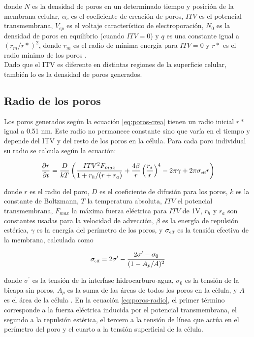 \documentclass[11pt, twocolumn]{article}
\begin{document}
donde $N$ es la densidad de poros en un determinado tiempo y posición de la membrana celular, $\alpha_c$ es el coeficiente de creación de poros, $ITV$ es el potencial transmembrana, $V_{ep}$ es el voltaje característico de electroporación, $N_0$ es la densidad de poros en equilibrio (cuando $ITV = 0$) y $q$ es una constante igual a $(r_m / r*)^2$, donde $r_m$ es el radio de mínima energía para $ITV = 0$ y $r*$ es el radio mínimo de los poros \cite{krass}.\\

Dado que el ITV es diferente en distintas regiones de la superficie celular, también lo es la densidad de poros generados.

\subsection{Radio de los poros}
Los poros generados según la ecuación \eqref{eq:poros-crea} tienen un radio inicial $r*$ igual a 0.51 $\si{\nano\metre}$. Este radio no permanece constante sino que varía en el tiempo y depende del ITV y del resto de los poros en la célula. Para cada poro individual su radio se calcula según la ecuación:

\begin{equation} \label{eq:poros-radio}
	\frac{\partial r}{\partial t} = \frac{D}{kT} \left( \frac{ITV^2 F_{max}}{1+r_h / (r+r_a)} + \frac{4 \beta}{r} \left(\frac{r_*}{r}\right)^4 - 2 \pi \gamma + 2 \pi \sigma_{\textrm{\tiny eff}} r\right)
\end{equation}

donde $r$ es el radio del poro, $D$ es el coeficiente de difusión para los poros, $k$ es la constante de Boltzmann, $T$ la temperatura absoluta, $ITV$ el potencial transmembrana, $F_{max}$ la máxima fuerza eléctrica para $ITV$ de 1V, $r_h$ y $r_a$ son constantes usadas para la velocidad de advección, $\beta$ es la energía de repulsión estérica, $\gamma$ es la energía del perímetro de los poros, y $\sigma_{\textrm{\tiny eff}}$ es la tensión efectiva de la membrana, calculada como

\begin{equation}
	\sigma_{\textrm{\tiny eff}} = 2 \sigma^\prime - \frac{2 \sigma^\prime - \sigma_0}{(1 - A_p / A)^2}
\end{equation}

donde $\sigma^\prime$ es la tensión de la interfase hidrocarburo-agua, $\sigma_0$ es la tensión de la bicapa sin poros, $A_p$ es la suma de las áreas de todos los poros en la célula, y $A$ es el área de la célula \cite{krass}. En la ecuación \ref{eq:poros-radio}, el primer término corresponde a la fuerza eléctrica inducida por el potencial transmembrana, el segundo a la repulsión estérica, el tercero a la tensión de línea que actúa en el perímetro del poro y el cuarto a la tensión superficial de la célula.\\
\end{document}

